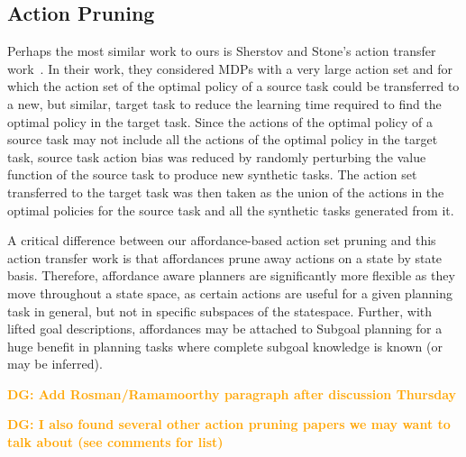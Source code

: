 \documentclass[]{article}
\newcommand{\jmnote}[1]{\textcolor{Green}{\textbf{JM: #1}}}
\newcommand{\dgnote}[1]{\textcolor{Orange}{\textbf{DG: #1}}}
\begin{document}
\subsection{Action Pruning}


Perhaps the most similar work to ours is Sherstov and Stone's action transfer work~\cite{sherstov2005improving}.
In their work, they considered MDPs with a very large action set and for which the action
set of the optimal policy of a source task could be transferred to a new, but similar, target
task to reduce the learning time required to find the optimal policy in the target task. Since the actions
of the optimal policy of a source task may not include all the actions of the optimal policy
in the target task, source task action bias was reduced by randomly perturbing the value function
of the source task to produce new synthetic tasks. The action set transferred to the target task
was then taken as the union of the actions in the optimal policies for the source task and all the
synthetic tasks generated from it.

A critical difference between our affordance-based action set pruning and this action transfer
work is that affordances prune away actions on a state by state basis. Therefore, affordance aware
planners are significantly more flexible as they move throughout a state space, as certain actions
are useful for a given planning task in general, but not in specific subspaces of the statespace. Further,
with lifted goal descriptions, affordances may be attached to Subgoal planning for a huge
benefit in planning tasks where complete subgoal knowledge is known (or may be inferred).

\dgnote{Add Rosman/Ramamoorthy paragraph after discussion Thursday}

\dgnote{I also found several other action pruning papers we may want to talk about (see comments for list)}
\end{document}
